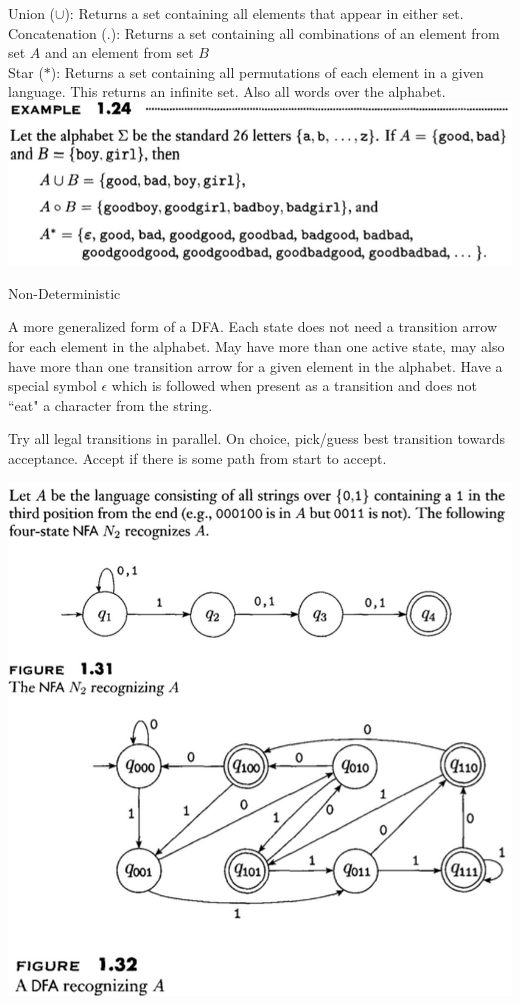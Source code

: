 \documentclass[8pt,landscape,legalpaper]{article}
\makeatletter
\renewcommand{\subsection}{\@startsection{subsection}{2}{0mm}
                                {-1explus -.5ex minus -.2ex}
                                {0.5ex plus .2ex}
                                {\normalfont\normalsize\bfseries}}
\makeatother
\begin{document}
\begin{multicols}{6}
Union ($\cup$): Returns a set containing all elements that appear in either set.\\
Concatenation ($.$): Returns a set containing all combinations of an element from set $A$ and an element from set $B$\\
Star ($*$): Returns a set containing all permutations of each element in a given language. This returns an infinite set. Also all words over the alphabet.\\

\includegraphics[scale=0.35]{operations.png}

\subsection{Non-Deterministic}

A more generalized form of a DFA. Each state does not need a transition arrow for each element in the alphabet. May have more than one active state, may also have more than one transition arrow for a given element in the alphabet. Have a special symbol $\epsilon$ which is followed when present as a transition and does not ``eat" a character from the string.

Try all legal transitions in parallel. On choice, pick/guess best transition towards acceptance. Accept if there is some path from start to accept.

\includegraphics[scale=0.25]{nfa_dfa.png}


\end{multicols}
\end{document}
